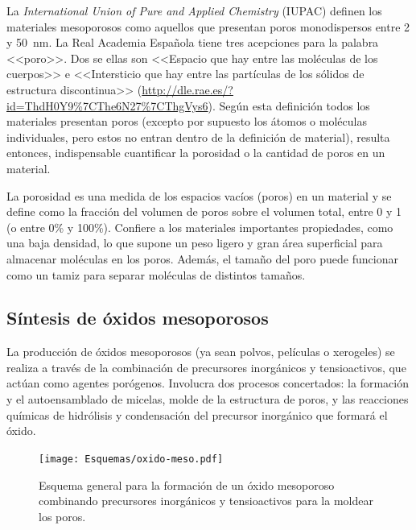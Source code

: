 	 La \textit{International Union of Pure and Applied Chemistry} (IUPAC) definen los materiales mesoporosos como aquellos que presentan poros monodispersos entre 2 y \SI{50}{\nm}. La Real Academia Española tiene tres acepciones para la palabra <<poro>>. Dos se ellas son <<Espacio que hay entre las moléculas de los cuerpos>> e <<Intersticio que hay entre las partículas de los sólidos de estructura discontinua>> (\url{http://dle.rae.es/?id=ThdH0Y9%7CThe6N27%7CThgVys6}). Según esta definición todos los materiales presentan poros (excepto por supuesto los átomos o moléculas individuales, pero estos no entran dentro de la definición de material), resulta entonces, indispensable cuantificar la porosidad o la cantidad de poros en un material.\cite{Brinker1990,Lu1997,Innocenzi2013}

	 \pagebreak La porosidad es una medida de los espacios vacíos (poros) en un material y se define como la fracción del volumen de poros sobre el volumen total, entre 0 y 1 (o entre 0\% y 100\%).\cite{iupac-1994} Confiere a los materiales importantes propiedades, como una baja densidad, lo que supone un peso ligero y gran área superficial para almacenar moléculas en los poros. Además, el tamaño del poro puede funcionar como un tamiz para separar moléculas de distintos tamaños.\cite{Martin2004} 

	\subsection{Síntesis de óxidos mesoporosos} 

	 La producción de óxidos mesoporosos (ya sean polvos, películas o xerogeles) se realiza a través de la combinación de precursores inorgánicos y tensioactivos, que actúan como agentes porógenos. Involucra dos procesos concertados: la formación y el autoensamblado de micelas, molde de la estructura de poros, y las reacciones químicas de hidrólisis y condensación del precursor inorgánico que formará el óxido. 

				\begin{figure}[h!]
 				\begin{center}
 				\texttt{[image: Esquemas/oxido-meso.pdf]}
 				\caption[Esquema general para la formación de un óxido mesoestructurado]{Esquema general para la formación de un óxido mesoporoso combinando precursores inorgánicos y tensioactivos para la moldear los poros.}
 		   		\label{fig:oxmeso}
 		    	\end{center}
 		    	\end{figure}

